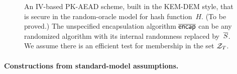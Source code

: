 \begin{figure}[tbhp]
\begin{center}

\medskip
\hspace*{.5ex} 
\caption{An IV-based PK-AEAD scheme, built in the KEM-DEM style,  that is secure in the random-oracle model for hash function~$H$. (To be proved.)  The unspecified encapsulation algorithm $\overline{\mathsf{encap}}$ can be any randomized algorithm with its internal randomness replaced by~$\overline{S}$.  We assume there is an efficient test for membership in the set $\mathcal{Z}_T$.
}
\label{fig:ro-kem-dem-construction}
\end{center}
\end{figure}

\paragraph{Constructions from standard-model assumptions. }


